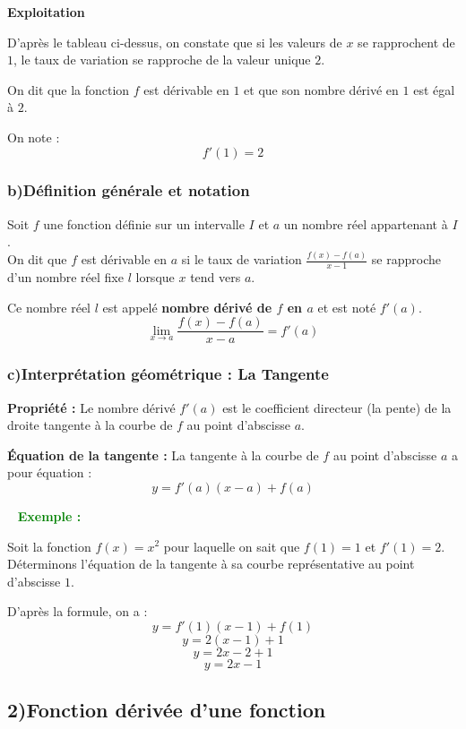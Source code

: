 \documentclass[12pt,a4paper]{article}
\newcounter{exemple}
\newcommand{\exemple}{%
  \refstepcounter{exemple}%
  \textbf{\textcolor{green}{Exemple \theexemple :}} \ignorespaces
}
\begin{document}
\begin{center}
\textbf{Exploitation}
\end{center}

D'après le tableau ci-dessus, on constate que si les valeurs de $x$ se rapprochent de $1$, le taux de variation se rapproche de la valeur unique $2$.

On dit que la fonction $f$ est dérivable en $1$ et que son nombre dérivé en $1$ est égal à $2$.

On note :
\[
f'(1) = 2
\]

\subsubsection*{b)\quad Définition générale et notation}

Soit $f$ une fonction définie sur un intervalle $I$ et $a$ un nombre réel appartenant à $I$.\\
On dit que $f$ est dérivable en $a$ si le taux de variation $\frac{f(x)-f(a)}{x-1}$ se rapproche d'un nombre réel fixe $l$ lorsque $x$ tend vers $a$.

Ce nombre réel $l$ est appelé \textbf{nombre dérivé de $f$ en $a$} et est noté $\boxed{f'(a)}$.
\[
\lim_{x \to a} \frac{f(x)-f(a)}{x-a} = f'(a)
\]

\bigskip

\subsubsection*{c)\quad Interprétation géométrique : La Tangente}
\textbf{Propriété :} Le nombre dérivé $f'(a)$ est le coefficient directeur (la pente) de la droite tangente à la courbe de $f$ au point d'abscisse $a$.

\textbf{Équation de la tangente :} 
La tangente à la courbe de $f$ au point d'abscisse $a$ a pour équation :
\[
y = f'(a)(x-a) + f(a)
\]

\bigskip

\checkmark\ \exemple 

Soit la fonction $f(x) = x^2$ pour laquelle on sait que $f(1)=1$ et $f'(1)=2$. 
Déterminons l'équation de la tangente à sa courbe représentative au point d'abscisse $1$.

D'après la formule, on a :
\[
y = f'(1)(x-1) + f(1)
\]
\[
y = 2(x-1) + 1
\]
\[
y = 2x - 2 + 1
\]
\[
\boxed{y = 2x - 1}
\]

\subsection*{2)\quad Fonction dérivée d'une fonction}
\end{document}
